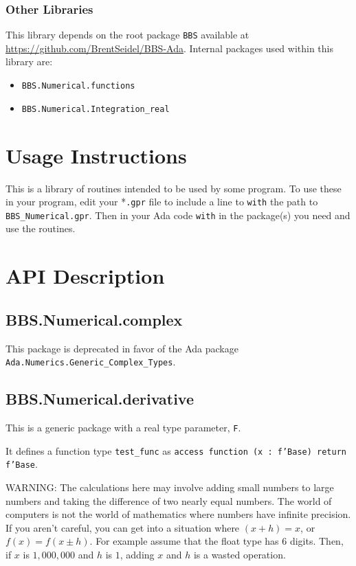 \documentclass[10pt, openany]{book}
\newcommand{\package}[1]{\texttt{#1}}
\newcommand{\keyword}[1]{\texttt{#1}}
\newcommand{\datatype}[1]{\texttt{#1}}
\begin{document}
\subsection{Other Libraries}
This library depends on the root package \package{BBS} available at \url{https://github.com/BrentSeidel/BBS-Ada}.
Internal packages used within this library are:
\begin{itemize}
  \item \package{BBS.Numerical.functions}
  \item \package{BBS.Numerical.Integration\_real}
\end{itemize}

\chapter{Usage Instructions}
This is a library of routines intended to be used by some program.  To use these in your program, edit your *\keyword{.gpr} file to include a line to \keyword{with} the path to \keyword{BBS\_Numerical.gpr}.  Then in your Ada code \keyword{with} in the package(s) you need and use the routines.

\chapter{API Description}
\section{BBS.Numerical.complex}
This package is deprecated in favor of the Ada package \package{Ada.Numerics.Generic\_Complex\_Types}.

\section{BBS.Numerical.derivative}
This is a generic package with a real type parameter, \datatype{F}.

It defines a function type \datatype{test\_func} as \datatype{access function (x : f'Base) return f'Base}.

WARNING:
The calculations here may involve adding small numbers to large numbers and taking the difference of two nearly equal numbers.
The world of computers is not the world of mathematics where numbers have infinite precision.  If you aren't careful, you can get into a situation where $(x + h) = x$, or $f(x) = f(x \pm h)$. For example assume that the float type has 6 digits.  Then, if $x$ is $1,000,000$ and $h$ is $1$, adding $x$ and $h$ is a wasted operation.
\end{document}
